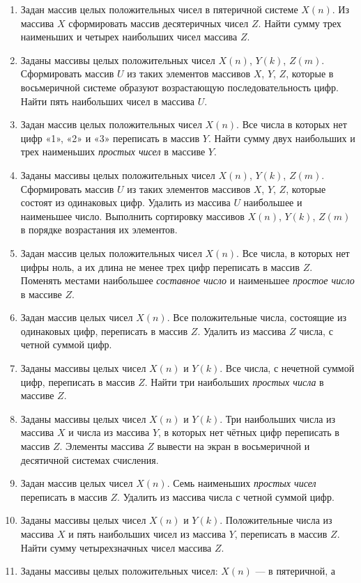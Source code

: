 \begin{enumerate}
\item Задан массив целых положительных чисел в пятеричной системе $X(n)$. Из массива
$X$ сформировать массив десятеричных чисел $Z$. Найти сумму трех наименьших и четырех наибольших
чисел массива $Z$. 
\item Заданы массивы целых положительных чисел $X(n)$, $Y(k)$,
$Z(m)$. Сформировать массив $U$ из таких элементов массивов
$X$, $Y$, $Z$, которые в восьмеричной системе образуют возрастающую
последовательность цифр. Найти пять наибольших чисел в массива $U$.
\item Задан массив целых положительных чисел $X(n)$. Все числа в которых нет цифр «1», «2» и
«3» переписать в массив $Y$. Найти сумму двух наибольших и трех наименьших \emph{простых
чисел} в массиве $Y$. 
\item Заданы массивы целых положительных чисел $X(n)$, $Y(k)$,
$Z(m)$. Сформировать массив $U$ из таких элементов массивов
$X$, $Y$, $Z$, которые состоят из одинаковых цифр. Удалить из массива
$U$ наибольшее и наименьшее число. Выполнить сортировку массивов $X(n)$,
$Y(k)$, $Z(m)$ в порядке возрастания их элементов.
\item Задан массив целых положительных чисел $X(n)$. Все числа, в которых нет цифры ноль, а их
длина не менее трех цифр переписать в массив $Z$. Поменять местами наибольшее \emph{составное
число} и наименьшее \emph{простое число} в массиве $Z$.
\item Задан массив целых чисел $X(n)$. Все положительные числа, состоящие из одинаковых цифр,
переписать в массив $Z$. Удалить из массива $Z$ числа, с четной суммой цифр.
\item Заданы массивы целых чисел $X(n)$ и $Y(k)$. Все числа, с
нечетной суммой цифр, переписать в массив $Z$. Найти три наибольших \emph{простых числа} в массиве $Z$.
\item Заданы массивы целых чисел $X(n)$ и $Y(k)$. Три наибольших числа
из массива $X$ и числа из массива $Y$, в которых нет чётных цифр переписать в массив
$Z$. Элементы массива $Z$ вывести на экран в восьмеричной и десятичной системах
счисления.
\item Задан массив целых чисел $X(n)$. Семь наименьших \emph{простых чисел}
переписать в массив $Z$. Удалить из массива числа с четной суммой цифр.
\item Заданы массивы целых чисел $X(n)$ и $Y(k)$. Положительные числа
из массива $X$ и пять наибольших чисел из массива $Y$, переписать в массив
$Z$. Найти сумму четырехзначных чисел массива $Z$.
\item Заданы массивы целых положительных чисел:  $X(n)$ --- в пятеричной, а

\end{enumerate}

